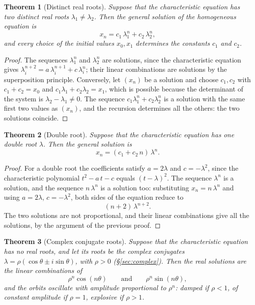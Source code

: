 \documentclass[11pt,a4paper]{article}
\theoremstyle{definition} \newtheorem{definition}{Definition} \theoremstyle{plain} \newtheorem{theorem}{Theorem}
\begin{document}
\begin{theorem}[Distinct real roots]\label{thm:distinct-real-roots} Suppose that the characteristic
equation has two distinct real roots $\lambda_1\neq\lambda_2$. Then the
general solution of the homogeneous equation is
\[ x_n = c_1\,\lambda_1^n+c_2\,\lambda_2^n, \]
and every choice of the initial values $x_0,x_1$ determines the
constants $c_1$ and $c_2$.
\end{theorem}

\begin{proof} The sequences $\lambda_1^n$ and $\lambda_2^n$ are
solutions, since the characteristic equation gives
$\lambda_i^{n+2}=a\,\lambda_i^{n+1}+c\,\lambda_i^n$; their linear
combinations are solutions by the superposition principle. Conversely,
let $(x_n)$ be a solution and choose $c_1,c_2$ with $c_1+c_2=x_0$ and
$c_1\lambda_1+c_2\lambda_2=x_1$, which is possible because the
determinant of the system is $\lambda_2-\lambda_1\neq 0$. The sequence
$c_1\lambda_1^n+c_2\lambda_2^n$ is a solution with the same first two
values as $(x_n)$, and the recursion determines all the others: the two
solutions coincide. \end{proof}

\begin{theorem}[Double root]\label{thm:double-root} Suppose that the characteristic equation has
one double root $\lambda$. Then the general solution is
\[ x_n = (c_1+c_2\,n)\,\lambda^n. \]
\end{theorem}

\begin{proof} For a double root the coefficients satisfy $a=2\lambda$ and
$c=-\lambda^2$, since the characteristic polynomial $t^2-a\,t-c$ equals
$(t-\lambda)^2$. The sequence $\lambda^n$ is a solution, and the
sequence $n\,\lambda^n$ is a solution too: substituting $x_n=n\,\lambda^n$
and using $a=2\lambda$, $c=-\lambda^2$, both sides of the equation reduce
to
\[ (n+2)\,\lambda^{n+2}. \]
The two solutions are not proportional, and their linear combinations
give all the solutions, by the argument of the previous proof.
\end{proof}

\begin{theorem}[Complex conjugate roots]\label{thm:complex-roots} Suppose that the characteristic
equation has no real roots, and let its roots be the complex conjugates
$\lambda=\rho(\cos\theta\pm i\sin\theta)$, with $\rho>0$ (\S\ref{sec:complex}). Then the
real solutions are the linear combinations of
\[ \rho^n\cos(n\theta) \qquad\text{and}\qquad \rho^n\sin(n\theta), \]
and the orbits oscillate with amplitude proportional to $\rho^n$: damped
if $\rho<1$, of constant amplitude if $\rho=1$, explosive if $\rho>1$.
\end{theorem}
\end{document}
